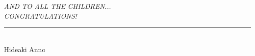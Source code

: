 \chapter*{} %

\begin{flushright}
    \textit{AND TO ALL THE CHILDREN... \\ CONGRATULATIONS!} \\
    \rule{5cm}{0.5pt} 
    \\ Hideaki Anno
\end{flushright}

